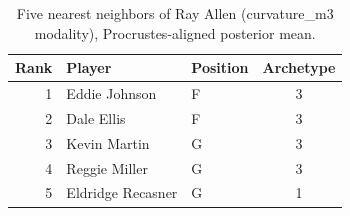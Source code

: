 \begin{table}[htbp]
  \centering\small
  \begin{tabular}{rllc}
    \toprule
    Rank & Player & Position & Archetype \\
    \midrule
    1 & Eddie Johnson & F & 3 \\
    2 & Dale Ellis & F & 3 \\
    3 & Kevin Martin & G & 3 \\
    4 & Reggie Miller & G & 3 \\
    5 & Eldridge Recasner & G & 1 \\
    \bottomrule
  \end{tabular}
  \caption{Five nearest neighbors of Ray Allen (curvature_m3 modality), Procrustes-aligned posterior mean.}
  \label{tab:Ray_Allen_neighbors_curvature_m3}
\end{table}


